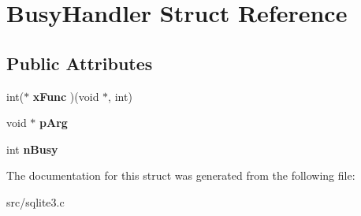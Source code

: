 \hypertarget{struct_busy_handler}{\section{Busy\-Handler Struct Reference}
\label{struct_busy_handler}
}
\subsection*{Public Attributes}
\begin{DoxyCompactItemize}
\item 
\hypertarget{struct_busy_handler_aafc84c4e4934de2d5bdf02f268e9340f}{int($\ast$ {\bfseries x\-Func} )(void $\ast$, int)}\label{struct_busy_handler_aafc84c4e4934de2d5bdf02f268e9340f}

\item 
\hypertarget{struct_busy_handler_a1c793d2b815e79cf3684de46847551bd}{void $\ast$ {\bfseries p\-Arg}}\label{struct_busy_handler_a1c793d2b815e79cf3684de46847551bd}

\item 
\hypertarget{struct_busy_handler_aac4531c677ed5ae9e4757ca1b02c568b}{int {\bfseries n\-Busy}}\label{struct_busy_handler_aac4531c677ed5ae9e4757ca1b02c568b}

\end{DoxyCompactItemize}


The documentation for this struct was generated from the following file\-:\begin{DoxyCompactItemize}
\item 
src/sqlite3.\-c\end{DoxyCompactItemize}
